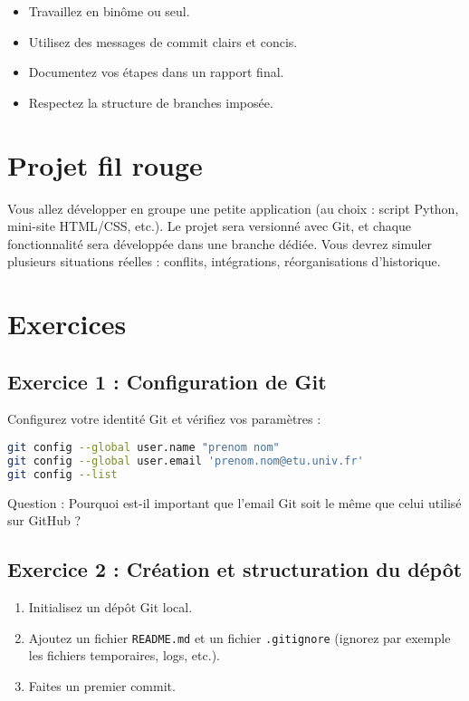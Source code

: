 \documentclass[a4paper,12pt]{article}
\begin{document}
\begin{itemize}
    \item Travaillez en binôme ou seul.
    \item Utilisez des messages de commit clairs et concis.
    \item Documentez vos étapes dans un rapport final.
    \item Respectez la structure de branches imposée.
\end{itemize}

\section*{Projet fil rouge}

Vous allez développer en groupe une petite application (au choix : script Python, mini-site HTML/CSS, etc.).  
Le projet sera versionné avec Git, et chaque fonctionnalité sera développée dans une branche dédiée.  
Vous devrez simuler plusieurs situations réelles : conflits, intégrations, réorganisations d’historique.

\section*{Exercices}

\subsection*{Exercice 1 : Configuration de Git}

Configurez votre identité Git et vérifiez vos paramètres :
\begin{lstlisting}[language=bash]
git config --global user.name "prenom nom"
git config --global user.email 'prenom.nom@etu.univ.fr'
git config --list
\end{lstlisting}
Question : Pourquoi est-il important que l’email Git soit le même que celui utilisé sur GitHub ?

\subsection*{Exercice 2 : Création et structuration du dépôt}

\begin{enumerate}
    \item Initialisez un dépôt Git local.
    \item Ajoutez un fichier \texttt{README.md} et un fichier \texttt{.gitignore} (ignorez par exemple les fichiers temporaires, logs, etc.).
    \item Faites un premier commit.
\end{enumerate}
\end{document}
